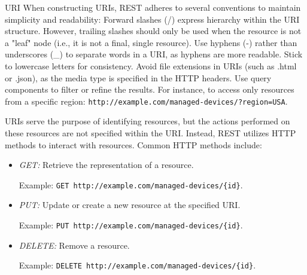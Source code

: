 \begin{Notation}{URI}{}
    When constructing URIs, REST adheres to several conventions to maintain simplicity and readability: Forward slashes (/) express hierarchy within the URI structure. However, trailing slashes should only be used when the resource is not a "leaf" node (i.e., it is not a final, single resource). Use hyphens (-) rather than underscores (\_) to separate words in a URI, as hyphens are more readable. Stick to lowercase letters for consistency. Avoid file extensions in URIs (such as .html or .json), as the media type is specified in the HTTP headers. Use query components to filter or refine the results. For instance, to access only resources from a specific region: \texttt{http://example.com/managed-devices/?region=USA}.
\end{Notation}

URIs serve the purpose of identifying resources, but the actions performed on these resources are not specified within the URI. Instead, REST utilizes HTTP methods to interact with resources. Common HTTP methods include:
\begin{itemize}
    \item \textit{GET:} Retrieve the representation of a resource. 
    
    Example: \texttt{GET http://example.com/managed-devices/\{id\}}.
    \item \textit{PUT:} Update or create a new resource at the specified URI. 
    
    Example: \texttt{PUT http://example.com/managed-devices/\{id\}}.
    \item \textit{DELETE:} Remove a resource. 
    
    Example: \texttt{DELETE http://example.com/managed-devices/\{id\}}.
\end{itemize}

